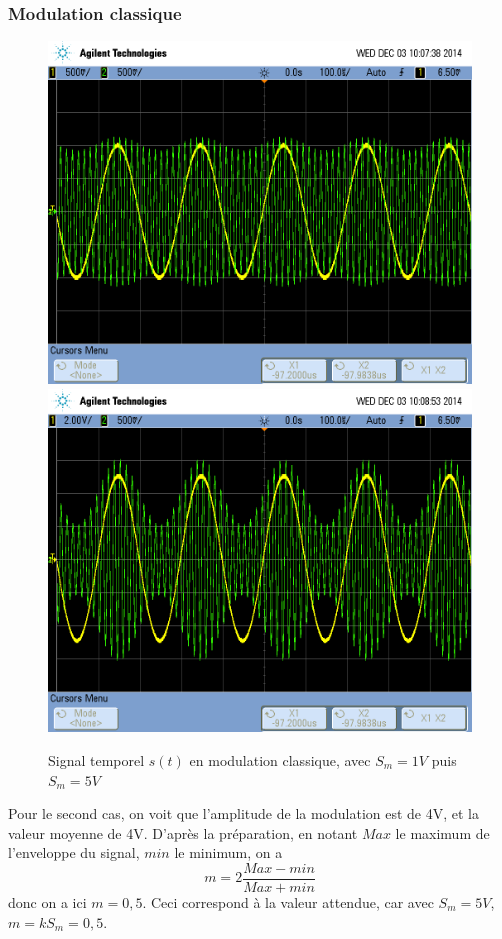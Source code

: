 \documentclass[../../Cours_M1.tex]{subfiles}
\begin{document}
\subsubsection*{Modulation classique}
\begin{figure}[h!]
\centering
\includegraphics[scale=0.2]{DBPC1.png}
\includegraphics[scale=0.2]{DBPC5.png}
\caption{Signal temporel $s(t)$ en modulation classique, avec $S_m=1V$ puis $S_m=5V$}
\end{figure}

Pour le second cas, on voit que l'amplitude de la modulation est de 4V, et la valeur moyenne de 4V. D'après la préparation, en notant $Max$ le maximum de l'enveloppe du signal, $min$ le minimum, on a
\[m= 2\frac{Max-min}{Max+min}\] donc on a ici $m=0,5$. Ceci correspond à la valeur attendue, car avec $S_m=5V$, $m=kS_m=0,5$.
\end{document}
